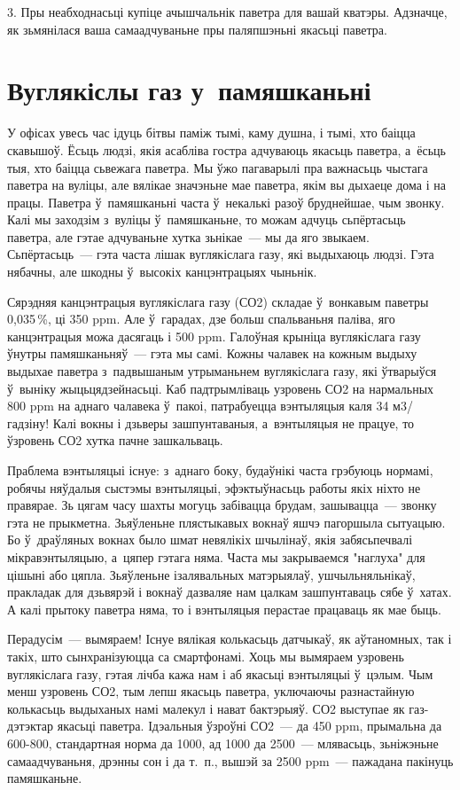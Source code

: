 3. Пры неабходнасьці купіце ачышчальнік паветра для вашай кватэры. Адзначце, як зьмянілася ваша самаадчуваньне пры паляпшэньні якасьці паветра.


\section{Вуглякіслы газ у~памяшканьні}

У офісах увесь час ідуць бітвы паміж тымі, каму душна, і тымі, хто баіцца скавышоў. Ёсьць людзі, якія асабліва гостра адчуваюць якасьць паветра, а~ёсьць тыя, хто баіцца сьвежага паветра. Мы ўжо пагаварылі пра важнасьць чыстага паветра на вуліцы, але вялікае значэньне мае паветра, якім вы дыхаеце дома і на працы. Паветра ў~памяшканьні часта ў~некалькі разоў бруднейшае, чым звонку. Калі мы заходзім з~вуліцы ў~памяшканьне, то можам адчуць сьпёртасьць паветра, але гэтае адчуваньне хутка зьнікае~--- мы да яго звыкаем. Сьпёртасьць~--- гэта часта лішак вуглякіслага газу, які выдыхаюць людзі. Гэта нябачны, але шкодны ў~высокіх канцэнтрацыях чыньнік.

Сярэдняя канцэнтрацыя вуглякіслага газу (СО2) складае ў~вонкавым паветры 0,035\,\%, ці 350 ppm. Але ў~гарадах, дзе больш спальваньня паліва, яго канцэнтрацыя можа дасягаць і 500 ppm. Галоўная крыніца вуглякіслага газу ўнутры памяшканьняў~--- гэта мы самі. Кожны чалавек на кожным выдыху выдыхае паветра з~падвышаным утрыманьнем вуглякіслага газу, які ўтварыўся ў~выніку жыцьцядзейнасьці. Каб падтрымліваць узровень СО2 на нармальных 800 ppm на аднаго чалавека ў~пакоі, патрабуецца вэнтыляцыя каля 34 м3/гадзіну! Калі вокны і дзьверы зашпунтаваныя, а~вэнтыляцыя не працуе, то ўзровень СО2 хутка пачне зашкальваць.

Праблема вэнтыляцыі існуе: з~аднаго боку, будаўнікі часта грэбуюць нормамі, робячы няўдалыя сыстэмы вэнтыляцыі, эфэктыўнасьць работы якіх ніхто не правярае. Зь цягам часу шахты могуць забівацца брудам, зашывацца~--- звонку гэта не прыкметна. Зьяўленьне плястыкавых вокнаў яшчэ пагоршыла сытуацыю. Бо ў~драўляных вокнах было шмат невялікіх шчылінаў, якія забясьпечвалі мікравэнтыляцыю, а~цяпер гэтага няма. Часта мы закрываемся "наглуха" для цішыні або цяпла. Зьяўленьне ізалявальных матэрыялаў, ушчыльняльнікаў, пракладак для дзьвярэй і вокнаў дазваляе нам цалкам зашпунтаваць сябе ў~хатах. А калі прытоку паветра няма, то і вэнтыляцыя перастае працаваць як мае быць.

Перадусім~--- вымяраем! Існуе вялікая колькасьць датчыкаў, як аўтаномных, так і такіх, што сынхранізуюцца са смартфонамі. Хоць мы вымяраем узровень вуглякіслага газу, гэтая лічба кажа нам і аб якасьці вэнтыляцыі ў~цэлым. Чым менш узровень СО2, тым лепш якасьць паветра, уключаючы разнастайную колькасьць выдыханых намі малекул і нават бактэрыяў. СО2 выступае як газ-дэтэктар якасьці паветра. Ідэальныя ўзроўні СО2~--- да 450 ppm, прымальна да 600-800, стандартная норма да 1000, ад 1000 да 2500~--- млявасьць, зьніжэньне самаадчуваньня, дрэнны сон і да т.~п., вышэй за 2500 ppm~--- пажадана пакінуць памяшканьне.

